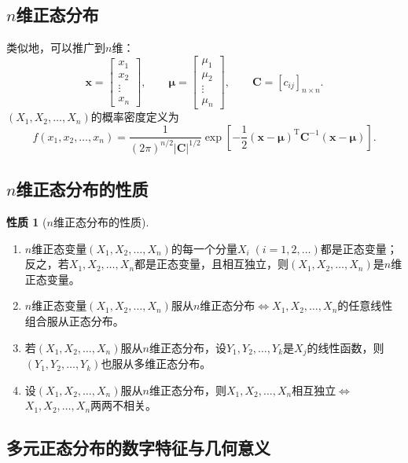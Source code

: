\documentclass[11pt,a4paper]{report}
\theoremstyle{definition}
\newtheorem{property}{性质}[chapter]
\begin{document}
\subsection{\texorpdfstring{$n$}{n}维正态分布}

类似地，可以推广到$n$维：
\[
\boldsymbol{x}=\left[\begin{matrix}x_{1}\\x_{2}\\\vdots\\x_{n}\end{matrix}\right],\qquad
\boldsymbol{\mu}=\left[\begin{matrix}\mu_{1}\\\mu_{2}\\\vdots\\\mu_{n}\end{matrix}\right],\qquad
\boldsymbol{C}=[c_{ij}]_{n\times n}.
\]
$(X_{1},X_{2},\ldots,X_{n})$的概率密度定义为
\[
f(x_{1},x_{2},\ldots,x_{n})=\frac{1}{(2\pi)^{n/2}|\boldsymbol{C}|^{1/2}}
\exp\left[-\frac{1}{2}(\boldsymbol{x}-\boldsymbol{\mu})^{\mathrm{T}}\boldsymbol{C}^{-1}(\boldsymbol{x}-\boldsymbol{\mu})\right].
\]

\subsection{\texorpdfstring{$n$}{n}维正态分布的性质}

\begin{property}[$n$维正态分布的性质]
\begin{enumerate}[label=\arabic*.,leftmargin=2em]
    \item $n$维正态变量$(X_{1},X_{2},\ldots,X_{n})$的每一个分量$X_{i}\;(i=1,2,\ldots)$都是正态变量；反之，若$X_{1},X_{2},\ldots,X_{n}$都是正态变量，且相互独立，则$(X_{1},X_{2},\ldots,X_{n})$是$n$维正态变量。
    \item $n$维正态变量$(X_{1},X_{2},\ldots,X_{n})$服从$n$维正态分布$\Longleftrightarrow$$X_{1},X_{2},\ldots,X_{n}$的任意线性组合服从正态分布。
    \item 若$(X_{1},X_{2},\ldots,X_{n})$服从$n$维正态分布，设$Y_{1},Y_{2},\ldots,Y_{k}$是$X_{j}$的线性函数，则$(Y_{1},Y_{2},\ldots,Y_{k})$也服从多维正态分布。
    \item 设$(X_{1},X_{2},\ldots,X_{n})$服从$n$维正态分布，则$X_{1},X_{2},\ldots,X_{n}$相互独立$\Longleftrightarrow$$X_{1},X_{2},\ldots,X_{n}$两两不相关。
\end{enumerate}
\end{property}

\subsection{多元正态分布的数字特征与几何意义}
\end{document}
